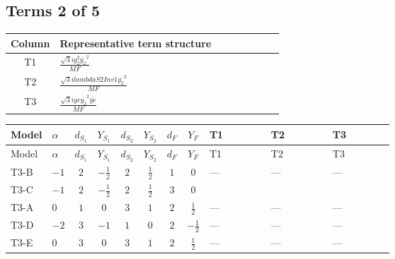 \documentclass[8pt]{article}
\begin{document}
\begin{landscape}
\subsection*{Terms 2 of 5}
\begin{center}
\begin{tabular}{@{}c >{\raggedright\arraybackslash}p{0.82\linewidth}@{}}
\toprule
Column & Representative term structure \\
\midrule
T1 & \(\displaystyle \frac{\sqrt{3} i g_{2}^{2} \overline{y_{2}}^{2}}{MF}\) \\
\midrule
T2 & \(\displaystyle \frac{\sqrt{3} i lambdaS2Inv1 \overline{y_{2}}^{2}}{MF}\) \\
\midrule
T3 & \(\displaystyle \frac{\sqrt{3} i ye \overline{y_{2}}^{2} \overline{ye}}{MF}\) \\
\midrule
\bottomrule
\end{tabular}
\end{center}
\smallskip
\tiny
\begin{longtable}{@{}llcccccc >{\raggedright\arraybackslash}p{0.21\linewidth} >{\raggedright\arraybackslash}p{0.21\linewidth} >{\raggedright\arraybackslash}p{0.21\linewidth}@{}}
\toprule
Model & $\alpha$ & $d_{S_1}$ & $Y_{S_1}$ & $d_{S_2}$ & $Y_{S_2}$ & $d_F$ & $Y_F$ & T1 & T2 & T3 \\
\midrule
\endfirsthead
\toprule
Model & $\alpha$ & $d_{S_1}$ & $Y_{S_1}$ & $d_{S_2}$ & $Y_{S_2}$ & $d_F$ & $Y_F$ & T1 & T2 & T3 \\
\midrule
\endhead
T3-B & $-1$ & $2$ & $-\frac{1}{2}$ & $2$ & $\frac{1}{2}$ & $1$ & $0$ & --- & --- & --- \\
\midrule
T3-C & $-1$ & $2$ & $-\frac{1}{2}$ & $2$ & $\frac{1}{2}$ & $3$ & $0$ & \scriptsize\adjustbox{max width=\linewidth}{$\begin{gathered} \frac{\sqrt{3} i g_{2}^{2} \overline{y_{2}}^{2}}{8 MF}\end{gathered}$} & \scriptsize\adjustbox{max width=\linewidth}{$\begin{gathered} \frac{\sqrt{3} i lambdaS2Inv1 \overline{y_{2}}^{2}}{12 MF}\end{gathered}$} & \scriptsize\adjustbox{max width=\linewidth}{$\begin{gathered} - \frac{\sqrt{3} i ye \overline{y_{2}}^{2} \overline{ye}}{24 MF}\end{gathered}$} \\
\midrule
T3-A & $0$ & $1$ & $0$ & $3$ & $1$ & $2$ & $\frac{1}{2}$ & --- & --- & --- \\
\midrule
T3-D & $-2$ & $3$ & $-1$ & $1$ & $0$ & $2$ & $-\frac{1}{2}$ & --- & --- & --- \\
\midrule
T3-E & $0$ & $3$ & $0$ & $3$ & $1$ & $2$ & $\frac{1}{2}$ & --- & --- & --- \\
\midrule
\bottomrule
\end{longtable}
\clearpage

\end{landscape}
\end{document}
